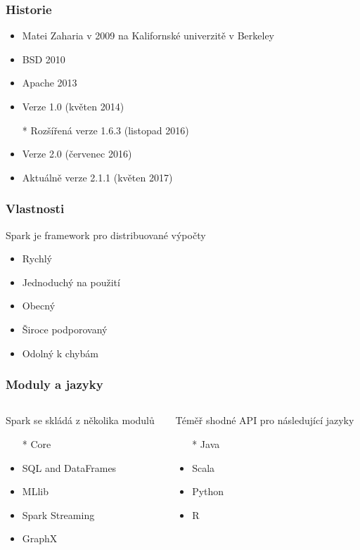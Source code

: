 \documentclass[xcolor=dvipsnames,compact]{beamer}
\begin{document}
\begin{frame}
	\frametitle{Historie}
	\begin{itemize}
		\item Matei Zaharia v 2009 na Kalifornské univerzitě v Berkeley
		\item BSD 2010
		\item Apache 2013
		\item Verze 1.0 (květen 2014)
		\item[*] Rozšířená verze 1.6.3 (listopad 2016)
		\item Verze 2.0 (červenec 2016)
		\item Aktuálně verze 2.1.1 (květen 2017) 
	\end{itemize}
\end{frame}

\begin{frame}
	\frametitle{Vlastnosti}
	Spark je framework pro distribuované výpočty
	\begin{itemize}
		\item Rychlý
		\item Jednoduchý na použití
		\item Obecný
		\item Široce podporovaný 
		\item Odolný k chybám
	\end{itemize}
\end{frame}

\begin{frame}
	\frametitle{Moduly a jazyky}
	\begin{columns}[T] %
		\begin{column}{.48\textwidth}
			Spark se skládá z několika modulů
			\begin{itemize}
				\item[*] Core
				\item SQL and DataFrames
				\item MLlib
				\item Spark Streaming
				\item GraphX
			\end{itemize}
		\end{column}
		\begin{column}{.48\textwidth}
			Téměř shodné API pro následující jazyky
			\begin{itemize}
				\item[*] Java
				\item Scala
				\item Python
				\item R
			\end{itemize}
		\end{column}
	\end{columns}
\end{frame}
\end{document}
